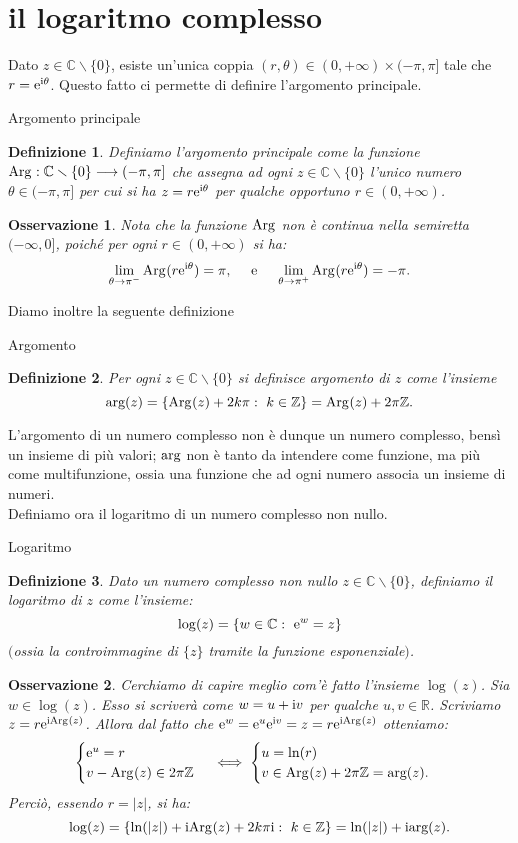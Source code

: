 \documentclass[11pt]{book}
\theoremstyle{Definizione}
\newtheorem*{mydef}{Definizione}
\theoremstyle{TeoremaProposizioneLemmaCorollarioCongettura}
\theoremstyle{OsservazioneNotaEsempio}
\newtheorem{myobs}{Osservazione}[section]
\newcommand{\R}{\mathbb{R}}
\newcommand{\Z}{\mathbb{Z}}
\newcommand{\C}{\mathbb{C}}
\newcommand{\tolto}{\smallsetminus}
\renewcommand{\arg}{\textup{arg}}
\newcommand{\Arg}[1][]{\textup{Arg}_{#1}}
\renewcommand{\i}{\textup{i}}
\newcommand{\e}{\textup{e}}
\begin{document}
\section{il logaritmo complesso}
Dato $z\in \C \tolto \{0\}$, esiste un'unica coppia $(r,\theta)\in (0,+\infty)\times (-\pi,\pi]$ tale che $r = \e^{\i \theta}$. Questo fatto ci permette di definire l'argomento principale.
\begin{boxdef}{Argomento principale}
\begin{mydef}
Definiamo l'argomento principale come la funzione $\Arg:\C\tolto \{0\} \longrightarrow (-\pi,\pi]$ che assegna ad ogni $z\in \C \tolto \{0\}$ l'unico numero $\theta\in (-\pi,\pi]$ per cui si ha $z = r\e^{\i\theta}$ per qualche opportuno $r \in (0,+\infty)$.
\end{mydef}
\end{boxdef}
\begin{myobs}
Nota che la funzione $\Arg$ non è continua nella semiretta $(-\infty,0]$, poiché per ogni $r\in (0,+\infty)$ si ha:
$$
\lim_{\theta \to \pi^-}\Arg(r\e^{\i\theta}) = \pi,\quad \textup{ e }\quad \lim_{\theta \to \pi^+} \Arg(r\e^{\i\theta}) = -\pi.
$$
\end{myobs}
Diamo inoltre la seguente definizione
\begin{boxdef}{Argomento}
\begin{mydef}
Per ogni $z\in \C \tolto \{0\}$ si definisce argomento di $z$ come l'insieme
$$
\arg(z) = \{\Arg(z) + 2k\pi:\ k\in \Z\} = \Arg(z) + 2\pi\Z.
$$
\end{mydef}
\end{boxdef}
\noindent
L'argomento di un numero complesso non è dunque un numero complesso, bensì un insieme di più valori; $\arg$ non è tanto da intendere come funzione, ma più come multifunzione, ossia una funzione che ad ogni numero associa un insieme di numeri.\\
Definiamo ora il logaritmo di un numero complesso non nullo.
\begin{boxdef}{Logaritmo}
\begin{mydef}
Dato un numero complesso non nullo $z\in \C \tolto \{0\}$, definiamo il logaritmo di $z$ come l'insieme:
$$
\log(z) = \{w\in \C:\ \e^{w} = z\}
$$
$($ossia la controimmagine di $\{z\}$ tramite la funzione esponenziale$)$.
\end{mydef}
\end{boxdef}
\begin{myobs}
Cerchiamo di capire meglio com'è fatto l'insieme $\log(z)$. Sia $w\in \log(z)$. Esso si scriverà come $w = u + \i v$ per qualche $u,v\in \R$. Scriviamo $z = r \e^{\i \Arg(z)}$. Allora dal fatto che $\e^w= \e^{u}\e^{\i v} = z = r \e^{\i \Arg(z)}$ otteniamo:
$$
\begin{cases}
\e^u = r\\
v-\Arg(z) \in 2\pi\Z
\end{cases} \iff
\begin{cases}
u = \ln(r)\\
v \in \Arg(z)+2\pi\Z = \arg(z).
\end{cases}
$$
Perciò, essendo $r= |z|$, si ha:
$$
\log(z) =\{\ln(|z|) + \i\Arg(z)+2k\pi\i:\ k\in \Z\} = \ln(|z|) + \i \arg(z).
$$
\end{myobs}
\end{document}
